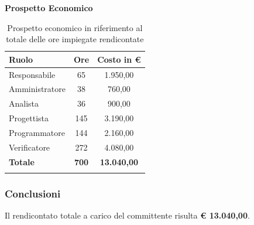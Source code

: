 \documentclass[../piano_di_progetto.tex]{subfiles}
\begin{document}
\vspace{3cm}

\textbf{Prospetto Economico}

\begin{center}
	\begin{longtable}{|l|c|c|}
		\hline
		\rowcolor{lightgray}
		\textbf{Ruolo} & \textbf{Ore} & \textbf{Costo in €}\\
		\hline
		
		Responsabile & 65 & 1.950,00 \\
		Amministratore & 38 & 760,00 \\
		Analista & 36 & 900,00 \\
		Progettista & 145 & 3.190,00 \\
		Programmatore & 144 & 2.160,00 \\
		Verificatore & 272 & 4.080,00 \\
		\hline
		\textbf{Totale} & \textbf{700} & \textbf{13.040,00}\\
		\hline
		\rowcolor{white}
		\caption{Prospetto economico in riferimento al totale delle ore impiegate rendicontate}
	\end{longtable}
\end{center}

\subsubsection{Conclusioni}
\label{ssub:prev_conc}
Il rendicontato totale a carico del committente risulta \textbf{€ 13.040,00}.
\end{document}
